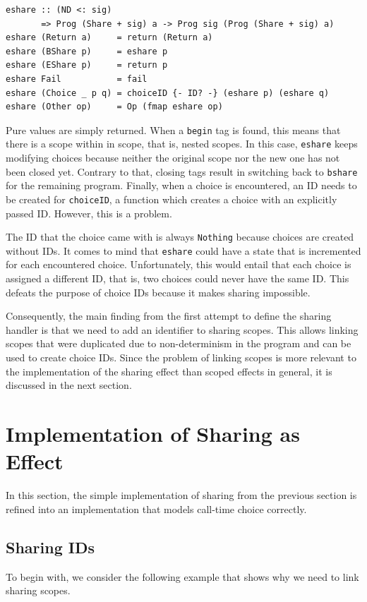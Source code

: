 \documentclass[a4paper, 11pt, fleqn, twoside]{scrreprt}
\newcommand{\hinl}[1]{\texttt{#1}}
\begin{document}
\begin{verbatim}
eshare :: (ND <: sig)
       => Prog (Share + sig) a -> Prog sig (Prog (Share + sig) a)
eshare (Return a)     = return (Return a)
eshare (BShare p)     = eshare p
eshare (EShare p)     = return p
eshare Fail           = fail
eshare (Choice _ p q) = choiceID {- ID? -} (eshare p) (eshare q)
eshare (Other op)     = Op (fmap eshare op)
\end{verbatim}

Pure values are simply returned.
When a \hinl{begin} tag is found, this means that there is a scope within in scope, that is, nested scopes.
In this case, \hinl{eshare} keeps modifying choices because neither the original scope nor the new one has not been closed yet.
Contrary to that, closing tags result in switching back to \hinl{bshare} for the remaining program.
Finally, when a choice is encountered, an ID needs to be created for  \hinl{choiceID}, a function which creates a choice with an explicitly passed ID.
However, this is a problem.

The ID that the choice came with is always \hinl{Nothing} because choices are created without IDs.
It comes to mind that \hinl{eshare} could have a state that is incremented for each encountered choice.
Unfortunately, this would entail that each choice is assigned a different ID, that is, two choices could never have the same ID.
This defeats the purpose of choice IDs because it makes sharing impossible.

Consequently, the main finding from the first attempt to define the sharing handler is that we need to add an identifier to sharing scopes.
This allows linking scopes that were duplicated due to non-determinism in the program and can be used to create choice IDs.
Since the problem of linking scopes is more relevant to the implementation of the sharing effect than scoped effects in general, it is discussed in the next section.

\section{Implementation of Sharing as Effect}
\label{subsec:sharingImplementation}
In this section, the simple implementation of sharing from the previous section is refined into an implementation that models call-time choice correctly.

\subsection{Sharing IDs}
To begin with, we consider the following example that shows why we need to link sharing scopes.
\end{document}
